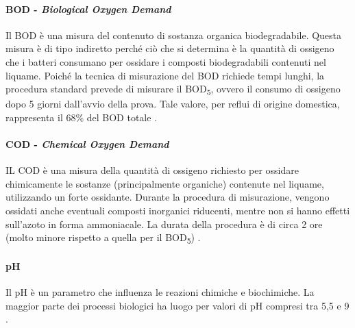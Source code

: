 \paragraph*{BOD - \textit{Biological Oxygen Demand}}
Il BOD è una misura del contenuto di sostanza organica biodegradabile. Questa misura è di tipo indiretto perché ciò che si determina è la quantità di ossigeno che i batteri consumano per ossidare i composti biodegradabili contenuti nel liquame. Poiché la tecnica di misurazione del BOD richiede tempi lunghi, la procedura standard prevede di misurare il BOD\textsubscript{5}, ovvero il consumo di ossigeno dopo 5 giorni dall'avvio della prova. Tale valore, per reflui di origine domestica, rappresenta il 68\% del BOD totale \cite{collivignarelli2012ingegneria}.
\paragraph*{COD - \textit{Chemical Oxygen Demand}}
IL COD è una misura della quantità di ossigeno richiesto per ossidare chimicamente le sostanze (principalmente organiche) contenute nel liquame, utilizzando un forte ossidante. Durante la procedura di misurazione, vengono ossidati anche eventuali composti inorganici riducenti, mentre non si hanno effetti sull'azoto in forma ammoniacale. La durata della procedura è di circa 2 ore (molto minore rispetto a quella per il BOD\textsubscript{5}) \cite{collivignarelli2012ingegneria}.

\paragraph*{pH}
Il pH è un parametro che influenza le reazioni chimiche e biochimiche. La maggior parte dei processi biologici ha luogo per valori di pH compresi tra 5,5 e 9 \cite{bonomo2008trattamenti}.
